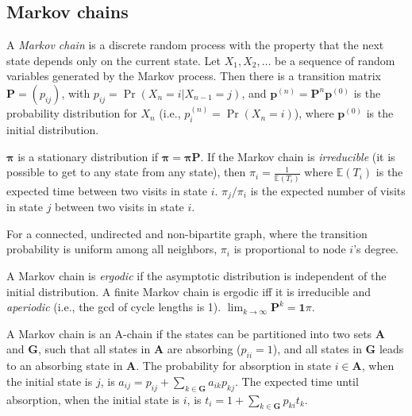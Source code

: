\documentclass[a4paper]{article}
\begin{document}
\begin{landscape}
\begin{multicols}{2}
\section{Markov chains}
A \emph{Markov chain} is a discrete random process with the property that the next state depends only on the current state.
Let $X_1,X_2,\ldots$ be a sequence of random variables generated by the Markov process.
Then there is a transition matrix $\mathbf{P} = (p_{ij})$, with $p_{ij} = \Pr(X_n = i | X_{n-1} = j)$,
and $\mathbf{p}^{(n)} = \mathbf P^n \mathbf p^{(0)}$ is the probability distribution for $X_n$ (i.e., $p^{(n)}_i = \Pr(X_n = i)$),
where $\mathbf{p}^{(0)}$ is the initial distribution.

$\mathbf{\pi}$ is a stationary distribution if $\mathbf{\pi} = \mathbf{\pi P}$.
If the Markov chain is \emph{irreducible} (it is possible to get to any state from any state),
then $\pi_i = \frac{1}{\mathbb{E}(T_i)}$ where $\mathbb{E}(T_i)$  is the expected time between two visits in state $i$.
$\pi_j/\pi_i$ is the expected number of visits in state $j$ between two visits in state $i$.

For a connected, undirected and non-bipartite graph, where the transition probability is uniform among all neighbors, $\pi_i$ is proportional to node $i$'s degree.

A Markov chain is \emph{ergodic} if the asymptotic distribution is independent of the initial distribution.
A finite Markov chain is ergodic iff it is irreducible and \emph{aperiodic} (i.e., the gcd of cycle lengths is 1).
$\lim_{k\rightarrow\infty}\mathbf{P}^k = \mathbf{1}\pi$.

A Markov chain is an A-chain if the states can be partitioned into two sets $\mathbf{A}$ and $\mathbf{G}$, such that all states in $\mathbf{A}$ are absorbing ($p_{ii}=1$), and all states in $\mathbf{G}$ leads to an absorbing state in $\mathbf{A}$.
The probability for absorption in state $i\in\mathbf{A}$, when the initial state is $j$, is $a_{ij} = p_{ij}+\sum_{k\in\mathbf{G}} a_{ik}p_{kj}$.
The expected time until absorption, when the initial state is $i$, is $t_i = 1+\sum_{k\in\mathbf{G}}p_{ki}t_k$.

\end{multicols}
\end{landscape}
\end{document}
